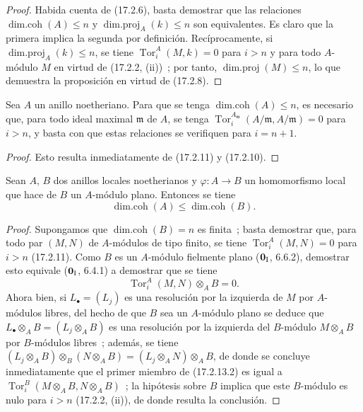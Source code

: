 \begin{proof}
Habida cuenta de (17.2.6), basta demostrar que las relaciones
$\operatorname{dim.coh}(A)\leq n$ y
$\operatorname{dim.proj}_A(k)\leq n$ son equivalentes. Es claro que la
primera implica la segunda por definición. Recíprocamente, si
$\operatorname{dim.proj}_A(k)\leq n$, se tiene
$\operatorname{Tor}^A_i(M,k)=0$ para $i>n$ y para todo $A$-módulo $M$ en
virtud de (17.2.2, (ii))~; por tanto, $\operatorname{dim.proj}(M)\leq n$, lo que
demuestra la proposición en virtud de (17.2.8).
\end{proof}

\begin{corollary}[17.2.12]
\label{0.17.2.12-fr}
Sea $A$ un anillo noetheriano. Para que se tenga
$\operatorname{dim.coh}(A)\leq n$, es necesario que, para todo ideal
maximal $\mathfrak{m}$ de $A$, se tenga
$\operatorname{Tor}^{A_{\mathfrak{m}}}_i(A/\mathfrak{m},A/\mathfrak{m})=0$
para $i>n$, y basta con que estas relaciones se verifiquen para $i=n+1$.
\end{corollary}

\begin{proof}
Esto resulta inmediatamente de (17.2.11) y (17.2.10).
\end{proof}

\begin{proposition}[17.2.13]
\label{0.17.2.13-fr}
Sean $A$, $B$ dos anillos locales noetherianos y
$\varphi:A\longrightarrow B$ un homomorfismo local que hace de $B$ un
$A$-módulo plano. Entonces se tiene
\begin{equation}
\label{0.17.2.13.1-fr}
\tag{17.2.13.1}
  \operatorname{dim.coh}(A)\leq\operatorname{dim.coh}(B).
\end{equation}
\end{proposition}

\begin{proof}
Supongamos que $\operatorname{dim.coh}(B)=n$ es finita~; basta demostrar
que, para todo par $(M,N)$ de $A$-módulos de tipo finito, se tiene
$\operatorname{Tor}^A_i(M,N)=0$ para $i>n$ (17.2.11). Como $B$ es un
$A$-módulo fielmente plano ($\mathbf{0}_{\rm I}$, 6.6.2), demostrar esto equivale
($\mathbf{0}_{\rm I}$, 6.4.1) a demostrar que se tiene
\begin{equation}
\label{0.17.2.13.2-fr}
\tag{17.2.13.2}
  \operatorname{Tor}^A_i(M,N)\otimes_A B=0.
\end{equation}
Ahora bien, si $L_\bullet=(L_j)$ es una resolución por la izquierda de $M$ por $A$-módulos
libres, del hecho de que $B$ sea un $A$-módulo plano se deduce que
$L_\bullet\otimes_A B=(L_j\otimes_A B)$ es una resolución por la izquierda del
$B$-módulo $M\otimes_A B$ por $B$-módulos libres~; además, se tiene
$(L_j\otimes_A B)\otimes_B(N\otimes_A B)
=(L_j\otimes_A N)\otimes_A B$, de donde se concluye inmediatamente que el primer miembro
de (17.2.13.2) es igual a
$\operatorname{Tor}^B_i(M\otimes_A B,N\otimes_A B)$~; la hipótesis sobre $B$
implica que este $B$-módulo es nulo para $i>n$ (17.2.2, (ii)), de donde resulta la
conclusión.
\end{proof}

